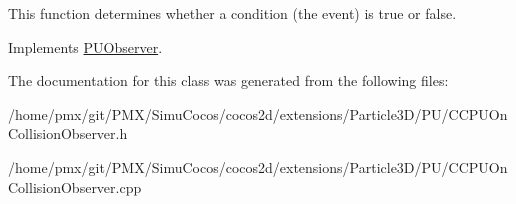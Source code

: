 This function determines whether a condition (the event) is true or false. 

Implements \hyperlink{classPUObserver_a50f59cc3245e291b641463db5d3037f7}{P\+U\+Observer}.



The documentation for this class was generated from the following files\+:\begin{DoxyCompactItemize}
\item 
/home/pmx/git/\+P\+M\+X/\+Simu\+Cocos/cocos2d/extensions/\+Particle3\+D/\+P\+U/C\+C\+P\+U\+On\+Collision\+Observer.\+h\item 
/home/pmx/git/\+P\+M\+X/\+Simu\+Cocos/cocos2d/extensions/\+Particle3\+D/\+P\+U/C\+C\+P\+U\+On\+Collision\+Observer.\+cpp\end{DoxyCompactItemize}
